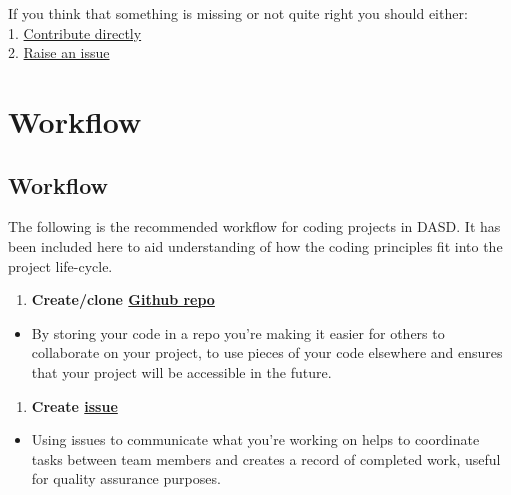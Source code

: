 \documentclass[]{book}
\providecommand{\tightlist}{%
  \setlength{\itemsep}{0pt}\setlength{\parskip}{0pt}}
\begin{document}
If you think that something is missing or not quite right you should either:\\
1. \protect\hyperlink{versioncontrol}{Contribute directly}\\
2. \href{https://github.com/moj-analytical-services/our-coding-standards/issues}{Raise an issue}

\hypertarget{part-workflow}{%
\part{Workflow}\label{part-workflow}}

\hypertarget{wf}{%
\chapter*{Workflow}\label{wf}}

The following is the recommended workflow for coding projects in DASD. It has been included here to aid understanding of how the coding principles fit into the project life-cycle.

\begin{enumerate}
\def\labelenumi{\arabic{enumi}.}
\tightlist
\item
  \textbf{Create/clone \protect\hyperlink{versioncontrol}{Github repo}}\\
\end{enumerate}

\begin{itemize}
\tightlist
\item
  By storing your code in a repo you're making it easier for others to collaborate on your project, to use pieces of your code elsewhere and ensures that your project will be accessible in the future.
\end{itemize}

\begin{enumerate}
\def\labelenumi{\arabic{enumi}.}
\setcounter{enumi}{1}
\tightlist
\item
  \textbf{Create \protect\hyperlink{versioncontrol}{issue}}\\
\end{enumerate}

\begin{itemize}
\tightlist
\item
  Using issues to communicate what you're working on helps to coordinate tasks between team members and creates a record of completed work, useful for quality assurance purposes.
\end{itemize}
\end{document}
